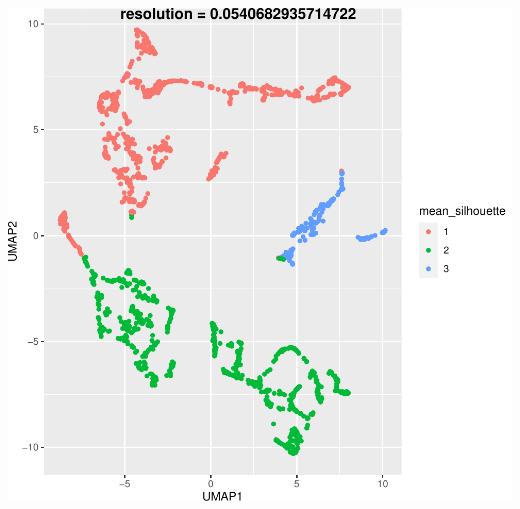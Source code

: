 \documentclass{beamer}
\begin{document}
{\begin{columns}
\begin{column}{0.50\textwidth}
			\includegraphics[width=\textwidth]{umap_sil.pdf}
		\end{column}
	\end{columns}
}
\end{document}

